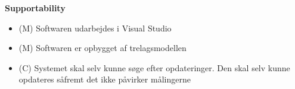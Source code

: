\textbf{Supportability}
\begin{itemize}
	\item (M) Softwaren udarbejdes i Visual Studio
	\item (M) Softwaren er opbygget af trelagsmodellen
	\item (C) Systemet skal selv kunne søge efter opdateringer. Den skal selv kunne opdateres såfremt det ikke påvirker målingerne
\end{itemize}














